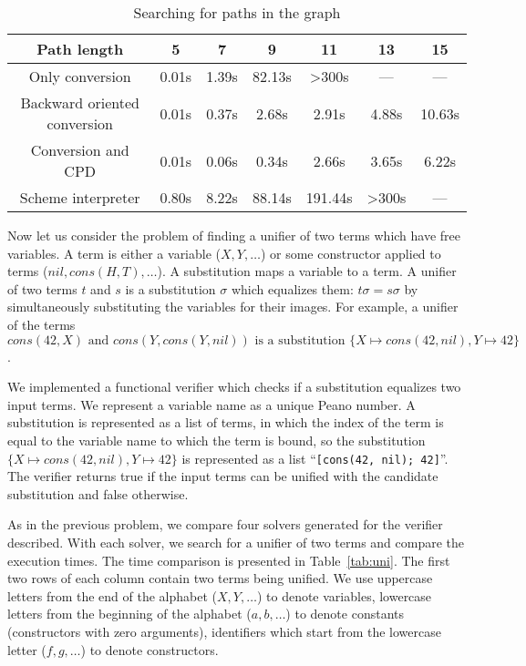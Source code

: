 \begin{table}
\centering
\begin{tabular}{c|c|c|c|c|c|c}
Path length                   & 5      & 7     & 9      & 11      & 13     & 15        \\
\hline\hline
Only conversion               & 0.01s  & 1.39s &  82.13s & >300s     & ---      & ---     \\
\hline
Backward oriented conversion  & 0.01s & 0.37s &  2.68s & 2.91s   & 4.88s    & 10.63s   \\
\hline
Conversion and CPD            & 0.01s  & 0.06s &  0.34s & 2.66s   & 3.65s    & 6.22s  \\
\hline
Scheme interpreter            & 0.80s  & 8.22s & 88.14s & 191.44s & >300s   & ---   \\
\end{tabular}

 \caption{Searching for paths in the graph}
    \label{tab:isPath}
\end{table}

Now let us consider the problem of finding a unifier of two terms which have free variables.
A term is either a variable ($X, Y, \dots$) or some constructor applied to terms ($nil, cons(H, T), \dots$). 
A substitution maps a variable to a term. 
A unifier of two terms $t$ and $s$ is a substitution $\sigma$ which equalizes them: $t \sigma = s \sigma$ by simultaneously substituting the variables for their images.
For example, a unifier of the terms $cons(42, X) \text{ and } cons(Y, cons(Y, nil)) \text{ is a substitution } \{X \mapsto cons(42, nil), Y \mapsto 42\} $.

We implemented a functional verifier which checks if a substitution equalizes two input terms. 
We represent a variable name as a unique Peano number. 
A substitution is represented as a list of terms, in which the index of the term is equal to the variable name to which the term is bound, so the substitution $\{X \mapsto cons(42, nil), Y \mapsto 42\}$ is represented as a list ``\lstinline{[cons(42, nil); 42]}''.
The verifier returns true if the input terms can be unified with the candidate substitution and false otherwise. 

As in the previous problem, we compare four solvers generated for the verifier described. 
With each solver, we search for a unifier of two terms and compare the execution times. 
The time comparison is presented in Table~\ref{tab:uni}. 
The first two rows of each column contain two terms being unified. 
We use uppercase letters from the end of the alphabet ($X, Y, \dots$) to denote variables, lowercase letters from the beginning of the alphabet ($a, b, \dots$) to denote constants (constructors with zero arguments), identifiers which start from the lowercase letter ($f, g,\dots$) to denote constructors.

